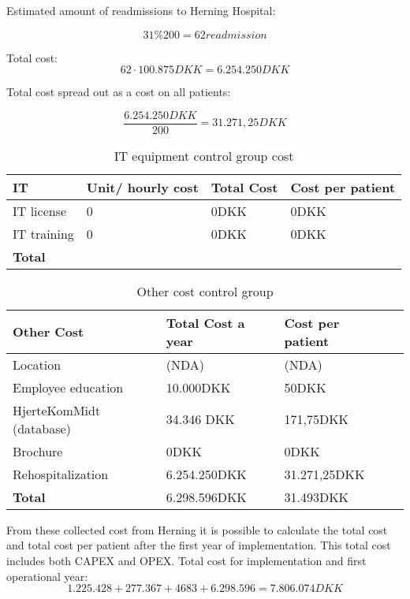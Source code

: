 Estimated amount of readmissions to Herning Hospital:

$$31\%200= 62 readmission$$

Total cost:
$$62\cdot100.875DKK=6.254.250DKK$$

Total cost spread out as a cost on all patients:

$$\frac{6.254.250DKK}{200}=31.271,25DKK$$

\begin{table}[H]
\begin{longtabu} to \linewidth{l l l l }
    \textbf{IT} & \textbf{Unit/ hourly cost} &\textbf{Total Cost} & \textbf{Cost per patient} \\[-1ex]
    \midrule
    IT license  & 0  & 0DKK  & 0DKK  \\  \hline
    IT training & 0 & 0DKK & 0DKK \\
    \hline \hline \hline
    \textbf{Total} &  &  & 
    \newline
    \newline
   \end{longtabu}
\caption{IT equipment control group cost}
\label{tab: ITC}
\end{table}

\begin{table}[H]
\begin{longtabu} to 
    \textbf{Other Cost} &\textbf{Total Cost a year} & \textbf{Cost per patient} \\[-1ex]
    \midrule
    Location   &  (NDA) & (NDA) \\ \hline
    Employee education   & 10.000DKK & 50DKK  \\ \hline
    HjerteKomMidt (database)  & 34.346 DKK &   171,75DKK \\ \hline
    Brochure & 0DKK & 0DKK \\ \hline
    Rehospitalization & 6.254.250DKK & 31.271,25DKK \\
    \hline \hline \hline
    \textbf{Total} & 6.298.596DKK  & 31.493DKK
    \newline
    \newline
   \end{longtabu}
\caption{Other cost control group}
\label{tab: OC}
\end{table}


From these collected cost from Herning it is possible to calculate the total cost and total cost per patient after the first year of implementation. This total cost includes both CAPEX and OPEX.
Total cost for implementation and first operational year:
$$1.225.428 + 277.367 + 4683 + 6.298.596 = 7.806.074DKK$$

